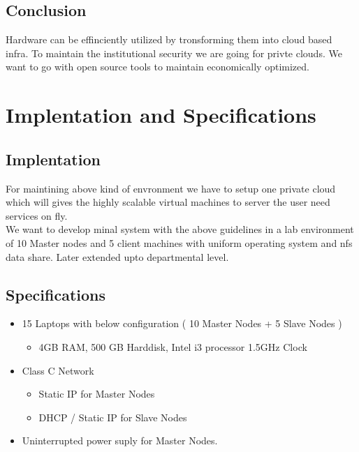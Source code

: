 \documentclass[12pt]{report}
\begin{document}
\section{Conclusion}

Hardware can be effinciently utilized by tronsforming them into cloud based infra. To maintain the institutional security we are going for privte clouds. We want to go with open source tools to maintain economically optimized.
	
\chapter{Implentation and Specifications}

\section{Implentation}

	For maintining above kind of envronment we have to setup one private cloud which will gives the highly scalable virtual machines to server the user need services on fly.\\
	
	We want to develop minal system with the above guidelines in a lab environment of 10 Master nodes and 5 client machines with uniform operating system and nfs data share. Later extended upto departmental level.
	
	
\section{Specifications}

	\begin{itemize}
		\item 15 Laptops with below configuration ( 10 Master Nodes + 5 Slave Nodes )
			\begin{itemize}
				\item 4GB RAM, 500 GB Harddisk, Intel i3 processor 1.5GHz Clock
			\end{itemize}
		
		\item Class C Network 
			\begin{itemize}
			 	\item Static IP for Master Nodes
			 	\item DHCP / Static IP for Slave Nodes
			\end{itemize}
			
		\item Uninterrupted power suply for Master Nodes.
		
	\end{itemize}
	
\end{document}
